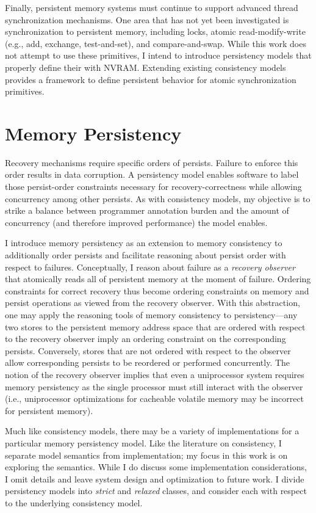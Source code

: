 Finally, persistent memory systems must continue to support advanced thread synchronization mechanisms.
One area that has not yet been investigated is synchronization to persistent memory, including locks, atomic read-modify-write (e.g., add, exchange, test-and-set), and compare-and-swap.
While this work does not attempt to use these primitives, I intend to introduce persistency models that properly define their with NVRAM.
Extending existing consistency models provides a framework to define persistent behavior for atomic synchronization primitives.

\section{Memory Persistency}
\label{sec:Persistency:Persistency}

Recovery mechanisms require specific orders of persists.
Failure to enforce this order results in data corruption.
A persistency model enables software to label those persist-order constraints necessary for recovery-correctness while allowing concurrency among other persists.
As with consistency models, my objective is to strike a balance between programmer annotation burden and the amount of concurrency (and therefore improved performance) the model enables.

I introduce memory persistency as an extension to memory consistency to additionally order persists and facilitate reasoning about persist order with respect to failures.
Conceptually, I reason about failure as a \emph{recovery observer} that atomically reads all of persistent memory at the moment of failure.
Ordering constraints for correct recovery thus become ordering constraints on memory and persist operations as viewed from the recovery observer.
With this abstraction, one may apply the reasoning tools of memory consistency to persistency---any two stores to the persistent memory address space that are ordered with respect to the recovery observer imply an ordering constraint on the corresponding persists.
Conversely, stores that are not ordered with respect to the observer allow corresponding persists to be reordered or performed concurrently.
The notion of the recovery observer implies that even a uniprocessor system requires memory persistency as the single processor must still interact with the observer (i.e., uniprocessor optimizations for cacheable volatile memory may be incorrect for persistent memory).

Much like consistency models, there may be a variety of implementations for a particular memory persistency model.
Like the literature on consistency, I separate model semantics from implementation; my focus in this work is on exploring the semantics.
While I do discuss some implementation considerations, I omit details and leave system design and optimization to future work.
I divide persistency models into \emph{strict} and \emph{relaxed} classes, and consider each with respect to the underlying consistency model.

